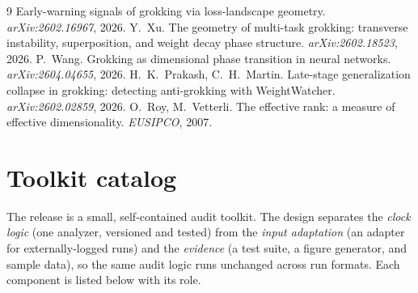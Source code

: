 \documentclass[11pt]{article}
\begin{document}
\begin{thebibliography}{9}
Early-warning signals of grokking via loss-landscape geometry. \emph{arXiv:2602.16967}, 2026.
 Y.~Xu.
The geometry of multi-task grokking: transverse instability, superposition, and weight decay phase
structure. \emph{arXiv:2602.18523}, 2026.
 P.~Wang.
Grokking as dimensional phase transition in neural networks. \emph{arXiv:2604.04655}, 2026.
 H.~K.~Prakash, C.~H.~Martin.
Late-stage generalization collapse in grokking: detecting anti-grokking with WeightWatcher.
\emph{arXiv:2602.02859}, 2026.
 O.~Roy, M.~Vetterli.
The effective rank: a measure of effective dimensionality. \emph{EUSIPCO}, 2007.
\end{thebibliography}

\clearpage
\appendix
\section{Toolkit catalog}
The release is a small, self-contained audit toolkit. The design separates the \emph{clock logic} (one
analyzer, versioned and tested) from the \emph{input adaptation} (an adapter for externally-logged runs)
and the \emph{evidence} (a test suite, a figure generator, and sample data), so the same audit logic
runs unchanged across run formats. Each component is listed below with its role.
\end{document}

